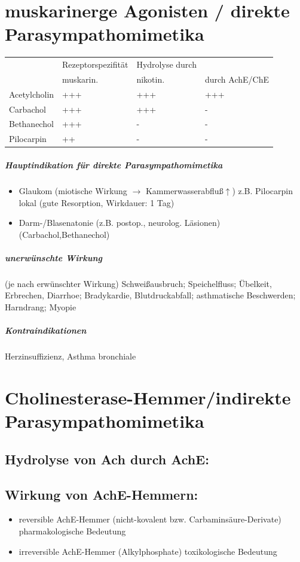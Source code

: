 \documentclass[10pt,a4paper]{report}
\begin{document}
\section{muskarinerge Agonisten / direkte Parasympathomimetika}
\begin{tabularx}{\textwidth}{XXXX}
&Rezeptorspezifität&Hydrolyse durch&\\
&muskarin.&nikotin.&durch AchE/ChE\\
Acetylcholin&+++&+++&+++\\
Carbachol&+++&+++&-\\
Bethanechol&+++&-&-\\
Pilocarpin&++&-&-\\
\end{tabularx}
\subparagraph{Hauptindikation für direkte Parasympathomimetika}
\begin{itemize}
	\item Glaukom (miotische Wirkung $\rightarrow$ Kammerwasserabfluß$\uparrow$) z.B. Pilocarpin lokal (gute Resorption, Wirkdauer: 1 Tag)
	\item Darm-/Blasenatonie (z.B. postop., neurolog. Läsionen)(Carbachol,Bethanechol)
\end{itemize}
\subparagraph{unerwünschte Wirkung}(je nach erwünschter Wirkung)
Schweißausbruch; Speichelfluss; Übelkeit, Erbrechen, Diarrhoe; Bradykardie, Blutdruckabfall; asthmatische Beschwerden; Harndrang; Myopie
\subparagraph{Kontraindikationen} Herzinsuffizienz, Asthma bronchiale
\section{Cholinesterase-Hemmer/indirekte Parasympathomimetika}
\subsection{Hydrolyse von Ach durch AchE:}
\subsection{Wirkung von AchE-Hemmern:}
\begin{itemize}
	\item reversible AchE-Hemmer (nicht-kovalent bzw. Carbaminsäure-Derivate) pharmakologische  Bedeutung
	\item irreversible AchE-Hemmer (Alkylphosphate) toxikologische Bedeutung
\end{itemize}
\end{document}
